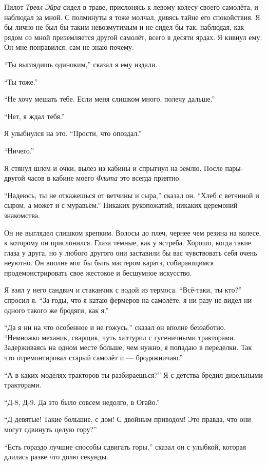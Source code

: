 Пилот {\it Тревл Эйра\/} сидел в траве, прислонясь к левому колесу своего самолёта, и наблюдал за мной. С полминуты я тоже молчал, дивясь тайне его спокойствия. Я бы лично не был бы таким невозмутимым и не сидел бы так, наблюдая, как рядом со мной приземляется другой самолёт, всего в десяти ярдах. Я кивнул ему. Он мне понравился, сам не знаю почему.

``Ты выглядишь одиноким,'' сказал я ему издали.

``Ты тоже.''

``Не хочу мешать тебе. Если меня слишком много, полечу дальше.''

``Нет, я ждал тебя.''

Я улыбнулся на это. ``Прости, что опоздал.''

``Ничего.''

Я стянул шлем и очки, вылез из кабины и спрыгнул на землю. После пары-другой часов в кабине моего
{\it Флита\/} это всегда приятно.

``Надеюсь, ты не откажешься от ветчины и сыра,'' сказал он. ``Хлеб с ветчиной и сыром, а может и с муравьём.''
Никаких рукопожатий, никаких церемоний знакомства.

Он не выглядел слишком крепким. Волосы до плеч, чернее чем резина на колесе, к которому он прислонился. Глаза темные, как у ястреба. Хорошо, когда такие глаза у друга, но у любого другого они заставили бы вас чувствовать себя очень неуютно. Он вполне мог бы быть мастером каратэ, собирающимся продемонстрировать свое жестокое и бесшумное искусство.

Я взял у него сандвич и стаканчик с водой из термоса.
``Всё-таки, ты кто?'' спросил я. ``За годы, что я катаю фермеров на самолёте, я ни разу не видел ни одного такого же бродяги, как я.''

``Да я ни на что особенное и не гожусь,'' сказал он вполне беззаботно. ``Немножко механик, сварщик, чуть халтурил с гусеничными тракторами. Задерживаясь на одном месте больше, чем нужно, я попадаю в переделки. Так что отремонтировал старый самолёт и --- бродяжничаю.''

``А в каких моделях тракторов ты разбираешься?'' Я с детства бредил дизельными тракторами.

``Д-8, Д-9. Да это было совсем недолго, в Огайо.''

``Д-девятые! Такие большие, с дом! С двойным приводом! Это правда, что они могут сдвинуть целую гору?''

``Есть гораздо лучшие способы сдвигать горы,'' сказал он с улыбкой, которая длилась разве что долю секунды.

